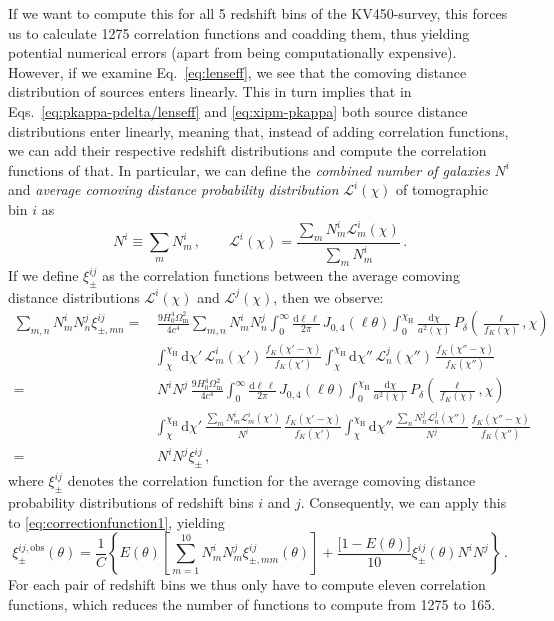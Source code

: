 \documentclass[referee]{aa} %
\renewcommand{\[}{\begin{equation}}
\renewcommand{\]}{\end{equation}}
\renewcommand{\rm}{\mathrm}
\begin{document}
If we want to compute this for all 5 redshift bins of the KV450-survey, this forces us to calculate 1275 correlation functions and coadding them, thus yielding potential numerical errors (apart from being computationally expensive). However, if we examine Eq.~\eqref{eq:lenseff}, we see that the comoving distance distribution of sources enters linearly. This in turn implies that in Eqs.~\eqref{eq:pkappa-pdelta/lenseff} and \eqref{eq:xipm-pkappa} both source distance distributions enter linearly, meaning that, instead of adding correlation functions, we can add their respective redshift distributions and compute the correlation functions of that. In particular, we can define the \textit{combined number of galaxies} $N^i$ and \textit{average comoving distance probability distribution} $\mathcal{L}^i(\chi)$ of tomographic bin $i$ as \[
N^i\equiv\sum_m N_m^i\, , \qquad \mathcal{L}^i(\chi) = \frac{\sum_m N_m^i \mathcal{L}_m^i(\chi)}{\sum_m N_m^i} \, .
\]
If we define $\xi^{ij}_\pm$ as the correlation functions between the average comoving distance distributions $\mathcal{L}^i(\chi)$ and $\mathcal{L}^j(\chi)$, then we observe: \begin{align}
\sum_{m,n}N_m^iN_n^j\xi^{ij}_{\pm,mn} = & \, \frac{9 H_0^4\Omega_{\rm m}^2}{4c^4} \sum_{m,n} N_m^i N_n^j \int_0^\infty \frac{{\rm d}\ell\,\ell}{2\pi}\, J_{0,4}(\ell\theta) \int_0^{\chi_{\rm{H}}} \frac{{\rm d}\chi}{a^2(\chi)}\, P_\delta\left(\frac{\ell}{f_K(\chi)},\chi\right) \\
& \int_\chi^{\chi_{\rm{H}}} {\rm d}\chi' \, \mathcal{L}^i_m(\chi') \, \frac{f_K(\chi'-\chi)}{f_K(\chi')}
\int_\chi^{\chi_{\rm{H}}} {\rm d}\chi'' \, \mathcal{L}^j_n(\chi'') \, \frac{f_K(\chi''-\chi)}{f_K(\chi'')} \\
 = & \,N^i N^j \, \frac{9 H_0^4\Omega_{\rm m}^2}{4c^4} \int_0^\infty \frac{{\rm d}\ell\,\ell}{2\pi}\, J_{0,4}(\ell\theta) \int_0^{\chi_{\rm{H}}} \frac{{\rm d}\chi}{a^2(\chi)}\, P_\delta\left(\frac{\ell}{f_K(\chi)},\chi\right) \\
& \int_\chi^{\chi_{\rm{H}}} {\rm d}\chi' \, \frac{\sum_m N_m^i \mathcal{L}^i_m(\chi')}{N^i} \, \frac{f_K(\chi'-\chi)}{f_K(\chi')}
\int_\chi^{\chi_{\rm{H}}} {\rm d}\chi'' \, \frac{\sum_n N_n^j \mathcal{L}^j_n(\chi'')}{N^j}  \, \frac{f_K(\chi''-\chi)}{f_K(\chi'')} \\
 = & \, N^iN^j\xi^{ij}_\pm\, ,
\end{align}
where $\xi^{ij}_\pm$ denotes the correlation function for the average comoving distance probability distributions of redshift bins $i$ and $j$.
Consequently, we can apply this to \eqref{eq:correctionfunction1}, yielding
\begin{equation}
\xi_{\pm}^{ij,\rm{obs}}(\theta) = \frac{1}{C}\left\{ E(\theta)\left[\sum_{m=1}^{10} N_m^iN_m^j \xi_{\pm,mm}^{ij}(\theta)\right] +\frac{\big[1-E(\theta)\big]}{10}\xi_\pm^{ij}(\theta)N^iN^j\right\}\, .
\label{eq:correctionfunction2}
\end{equation}
For each pair of redshift bins we thus only have to compute eleven correlation functions, which reduces the number of functions to compute from 1275 to 165.
\end{document}
